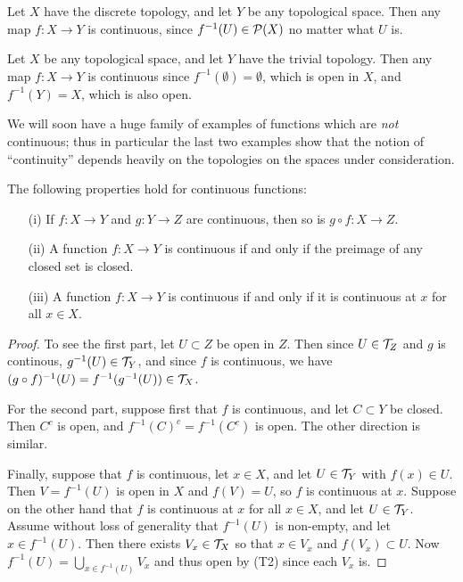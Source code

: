 \begin{example}
  Let $X$ have the discrete topology, and let $Y$ be any topological space. Then any map $f : X \to Y$ is continuous, since $f^{-1}(U) \in \mathcal{P}(X)$ no matter what $U$ is.
\end{example}
\begin{example}
  Let $X$ be any topological space, and let $Y$ have the trivial topology. Then any map $f : X \to Y$ is continuous since $f^{-1}(\emptyset) = \emptyset$, which is open in $X$, and $f^{-1}(Y) = X$, which is also open.
\end{example}
We will soon have a huge family of examples of functions which are \emph{not} continuous; thus in particular the last two examples show that the notion of ``continuity'' depends heavily on the topologies on the spaces under consideration.
\begin{thm}
  \label{continuous-props}
  The following properties hold for continuous functions:
  \begin{enumerate}
    \item[(i)] If $f: X \to Y$ and $g : Y \to Z$ are continuous, then so is $g \circ f : X \to Z$.
    \item[(ii)] A function $f : X \to Y$ is continuous if and only if the preimage of any closed set is closed.
    \item[(iii)] A function $f : X \to Y$ is continuous if and only if it is continuous at $x$ for all $x \in X$.
  \end{enumerate}
\end{thm}
\begin{proof}
  To see the first part, let $U \subset Z$ be open in $Z$. Then since $U \in \mathcal{T}_Z$ and $g$ is continous, $g^{-1}(U) \in \mathcal{T}_Y$, and since $f$ is continuous, we have $(g \circ f)^{-1}(U) = f^{-1}(g^{-1}(U)) \in \mathcal{T}_X$.
  
  For the second part, suppose first that $f$ is continuous, and let $C \subset Y$ be closed. Then $C^c$ is open, and $f^{-1}(C)^c = f^{-1}(C^c)$ is open. The other direction is similar.
  
  Finally, suppose that $f$ is continuous, let $x \in X$, and let $U \in \mathcal{T}_Y$ with $f(x) \in U$. Then $V = f^{-1}(U)$ is open in $X$ and $f(V) = U$, so $f$ is continuous at $x$. Suppose on the other hand that $f$ is continuous at $x$ for all $x \in X$, and let $U \in \mathcal{T}_Y$. Assume without loss of generality that $f^{-1}(U)$ is non-empty, and let $x \in f^{-1}(U)$. Then there exists $V_x \in \mathcal{T}_X$ so that $x \in V_x$ and $f(V_x) \subset U$. Now $f^{-1}(U) = \bigcup_{x \in f^{-1}(U)} V_x$ and thus open by (T2) since each $V_x$ is.
\end{proof}

